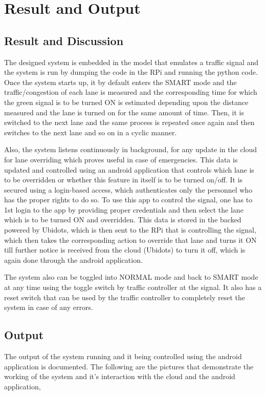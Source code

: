 \chapter{Result and Output}

\section{Result and Discussion}

The designed system is embedded in the model that emulates a traffic signal and the system is run by dumping the code in the RPi and running the python code. Once the system starts up, it by default enters the SMART mode and the traffic/congestion of each lane is measured and the corresponding time for which the green signal is to be turned ON is estimated depending upon the distance measured and the lane is turned on for the same amount of time. Then, it is switched to the next lane and the same process is repeated once again and then switches to the next lane and so on in a cyclic manner.

Also, the system listens continuously in background, for any update in the cloud for lane overriding which proves useful in case of emergencies. This data is updated and controlled using an android application that controls which lane is to be overridden or whether this feature in itself is to be turned on/off. It is secured using a login-based access, which authenticates only the personnel who has the proper rights to do so. To use this app to control the signal, one has to 1st login to the app by providing proper credentials and then select the lane which is to be turned ON and overridden. This data is stored in the backed powered by Ubidots, which is then sent to the RPi that is controlling the signal, which then takes the corresponding action to override that lane and turns it ON till further notice is received from the cloud (Ubidots) to turn it off, which is again done through the android application.

The system also can be toggled into NORMAL mode and back to SMART mode at any time using the toggle switch by traffic controller at the signal. It also has a reset switch that can be used by the traffic controller to completely reset the system in case of any errors.

\section{Output}

The output of the system running and it being controlled using the android application is documented. The following are the pictures that demonstrate the working of the system and it’s interaction with the cloud and the android application,

